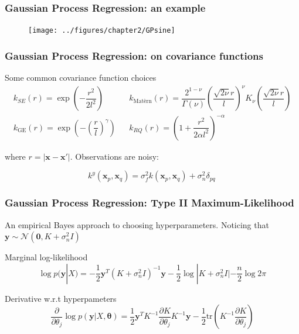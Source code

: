 \documentclass[10pt]{beamer}
\begin{document}
		\begin{frame}
			\frametitle{Gaussian Process Regression: an example}
			\begin{figure}
				\texttt{[image: ../figures/chapter2/GPsine]}
			\end{figure}
		\end{frame}
		
		\begin{frame}
			\frametitle{Gaussian Process Regression: on covariance functions}

			\begin{block}{Some common covariance function choices}
				\begin{equation}
				\begin{matrix}
				k_{SE}(r) = \exp\left(-\dfrac{r^2}{2l^2} \right) && 				k_{\textrm{Matèrn}}(r) = \dfrac{2^{1-\nu}}{\Gamma(\nu)}\left(\dfrac{\sqrt{2\nu} r}{l}    \right)^\nu K_\nu\left( \dfrac{
					\sqrt{2\nu}r}{l} \right) \\
				k_{\mathrm{GE}}(r) = \exp\left( - \left(\dfrac{r}{l}\right)^\gamma  \right) && k_{RQ}(r) = \left( 1 + \dfrac{r^2}{2\alpha l^2} \right)^{-\alpha}
				\end{matrix}
				\end{equation}
				
				where $r=|\boldsymbol{x} - \boldsymbol{x'}|$. Observations are noisy:
				
				\begin{equation}
					k^y(\boldsymbol{x}_p, \boldsymbol{x}_q) = \sigma^2_f k(\boldsymbol{x}_p, \boldsymbol{x}_q) + \sigma^2_n \delta_{pq} \,
				\end{equation} 
				
			\end{block}
		\end{frame}
		
		\begin{frame}
			\frametitle{Gaussian Process Regression: Type II Maximum-Likelihood}
			An empirical Bayes approach to choosing hyperparameters. Noticing that $\boldsymbol{y} \sim \mathcal{N}(\boldsymbol{0}, K + 
			\sigma_n^2 I)$
			\begin{block}{Marginal log-likelihood}
				\begin{equation}
				\log p(\boldsymbol{y}|X) = - \dfrac{1}{2}\boldsymbol{y}^T(K + \sigma^2_n I)^{-1}\boldsymbol{y} - \dfrac{1}{2}\log |K + \sigma^2_n I| - \dfrac{n}{2}\log 2\pi
				\end{equation}
			\end{block}
			
			\begin{block}{Derivative w.r.t hyperpameters}
				\begin{equation}
				\dfrac{\partial}{\partial \theta_j}\log p(\boldsymbol{y}|X, \boldsymbol{\theta}) = \dfrac{1}{2}\boldsymbol{y}^T K^{-1}\dfrac{\partial K}{\partial \theta_j}K^{-1}\boldsymbol{y} - \dfrac{1}{2}\textrm{tr}\left(K^{-1} \dfrac{\partial K}{\partial \theta_j} \right)
				\end{equation}
			\end{block}
		\end{frame}
			
\end{document}
